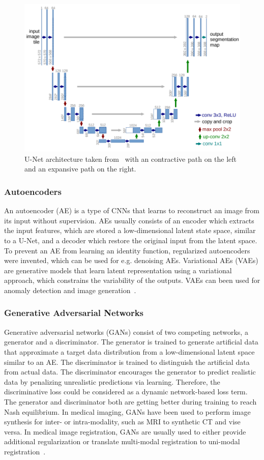 \documentclass[english,version-2022-01]{uzl-thesis} %
\begin{document}
\begin{figure}[h] %
	\centering
	\graphicspath{{images/}{\main/images/}}
	\includegraphics[width=.75\linewidth]{U-NetArchitecture.png} 
	\caption{U-Net architecture taken from~\cite{U-Net} with an contractive path on the left and an expansive path on the right.}
	\label{fig:U-NetArchitecture}
\end{figure}

\subsubsection{Autoencoders} \label{SubSubSec:Autoencoders}
An autoencoder (AE) is a type of CNNs that learns to reconstruct an image from its input without supervision. AEs usually consists of an encoder which extracts the input features, which are stored a low-dimensional latent state space, similar to a U-Net, and a decoder which restore the original input from the latent space. To prevent an AE from learning an identity function, regularized autoencoders were invented, which can be used for e.g. denoising AEs. Variational AEs (VAEs) are generative models that learn latent representation using a variational approach, which constrains the variability of the outputs. VAEs can been used for anomaly detection and image generation~\cite{Fu2020}.

\subsubsection{Generative Adversarial Networks} \label{SubSubSec:GANs}
Generative adversarial networks (GANs) consist of two competing networks, a generator and a discriminator. The generator is trained to generate artificial data that approximate a target data distribution from a low-dimensional latent space similar to an AE. The discriminator is trained to distinguish the artificial data from actual data. The discriminator encourages the generator to predict realistic data by penalizing unrealistic predictions via learning. Therefore, the discriminative loss could be considered as a dynamic network-based loss term. The generator and discriminator both are getting better during training to reach Nash equilibrium. In medical imaging, GANs have been used to perform image synthesis for inter- or intra-modality, such as MRI to synthetic CT and vise versa. In medical image registration, GANs are usually used to either provide additional regularization or translate multi-modal registration to uni-modal registration~\cite{Fu2020}.
\end{document}
